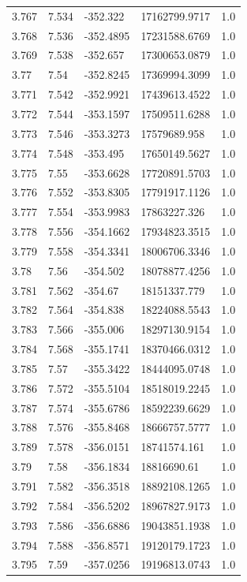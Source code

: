 \begin{tabular}{lllll}
3.767 & 7.534 & -352.322 & 17162799.9717 & 1.0 \\
3.768 & 7.536 & -352.4895 & 17231588.6769 & 1.0 \\
3.769 & 7.538 & -352.657 & 17300653.0879 & 1.0 \\
3.77 & 7.54 & -352.8245 & 17369994.3099 & 1.0 \\
3.771 & 7.542 & -352.9921 & 17439613.4522 & 1.0 \\
3.772 & 7.544 & -353.1597 & 17509511.6288 & 1.0 \\
3.773 & 7.546 & -353.3273 & 17579689.958 & 1.0 \\
3.774 & 7.548 & -353.495 & 17650149.5627 & 1.0 \\
3.775 & 7.55 & -353.6628 & 17720891.5703 & 1.0 \\
3.776 & 7.552 & -353.8305 & 17791917.1126 & 1.0 \\
3.777 & 7.554 & -353.9983 & 17863227.326 & 1.0 \\
3.778 & 7.556 & -354.1662 & 17934823.3515 & 1.0 \\
3.779 & 7.558 & -354.3341 & 18006706.3346 & 1.0 \\
3.78 & 7.56 & -354.502 & 18078877.4256 & 1.0 \\
3.781 & 7.562 & -354.67 & 18151337.779 & 1.0 \\
3.782 & 7.564 & -354.838 & 18224088.5543 & 1.0 \\
3.783 & 7.566 & -355.006 & 18297130.9154 & 1.0 \\
3.784 & 7.568 & -355.1741 & 18370466.0312 & 1.0 \\
3.785 & 7.57 & -355.3422 & 18444095.0748 & 1.0 \\
3.786 & 7.572 & -355.5104 & 18518019.2245 & 1.0 \\
3.787 & 7.574 & -355.6786 & 18592239.6629 & 1.0 \\
3.788 & 7.576 & -355.8468 & 18666757.5777 & 1.0 \\
3.789 & 7.578 & -356.0151 & 18741574.161 & 1.0 \\
3.79 & 7.58 & -356.1834 & 18816690.61 & 1.0 \\
3.791 & 7.582 & -356.3518 & 18892108.1265 & 1.0 \\
3.792 & 7.584 & -356.5202 & 18967827.9173 & 1.0 \\
3.793 & 7.586 & -356.6886 & 19043851.1938 & 1.0 \\
3.794 & 7.588 & -356.8571 & 19120179.1723 & 1.0 \\
3.795 & 7.59 & -357.0256 & 19196813.0743 & 1.0 \\

\end{tabular}
